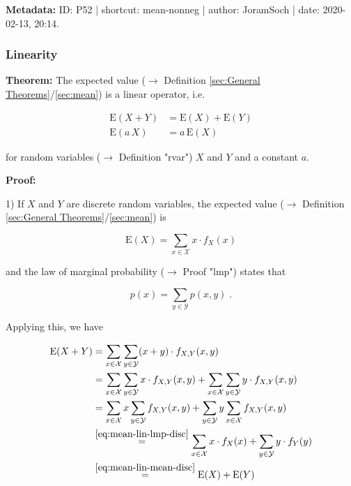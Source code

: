 \documentclass[a4paper,12pt]{book}
\begin{document}
\vspace{1em}
\textbf{Metadata:} ID: P52 | shortcut: mean-nonneg | author: JoramSoch | date: 2020-02-13, 20:14.


\subsubsection[\textbf{Linearity}]{Linearity} \label{sec:mean-lin}

\vspace{1em}
\textbf{Theorem:} The expected value ($\rightarrow$ Definition \ref{sec:General Theorems}/\ref{sec:mean}) is a linear operator, i.e.

\begin{equation} \label{eq:mean-lin-mean-lin}
\begin{split}
\mathrm{E}(X + Y) &= \mathrm{E}(X) + \mathrm{E}(Y) \\
\mathrm{E}(a\,X) &= a\,\mathrm{E}(X)
\end{split}
\end{equation}

for random variables ($\rightarrow$ Definition "rvar") $X$ and $Y$ and a constant $a$.


\vspace{1em}
\textbf{Proof:}

1) If $X$ and $Y$ are discrete random variables, the expected value ($\rightarrow$ Definition \ref{sec:General Theorems}/\ref{sec:mean}) is

\begin{equation} \label{eq:mean-lin-mean-disc}
\mathrm{E}(X) = \sum_{x \in \mathcal{X}} x \cdot f_X(x)
\end{equation}

and the law of marginal probability ($\rightarrow$ Proof "lmp") states that

\begin{equation} \label{eq:mean-lin-lmp-disc}
p(x) = \sum_{y \in \mathcal{Y}} p(x,y) \; .
\end{equation}

Applying this, we have

\begin{equation} \label{eq:mean-lin-mean-lin-s1-disc}
\begin{split}
\mathrm{E}(X + Y) &= \sum_{x \in \mathcal{X}} \sum_{y \in \mathcal{Y}} (x+y) \cdot f_{X,Y}(x,y) \\
&= \sum_{x \in \mathcal{X}} \sum_{y \in \mathcal{Y}} x \cdot f_{X,Y}(x,y) + \sum_{x \in \mathcal{X}} \sum_{y \in \mathcal{Y}} y \cdot f_{X,Y}(x,y) \\
&= \sum_{x \in \mathcal{X}} x \sum_{y \in \mathcal{Y}} f_{X,Y}(x,y) + \sum_{y \in \mathcal{Y}} y \sum_{x \in \mathcal{X}} f_{X,Y}(x,y) \\
&\overset{\eqref{eq:mean-lin-lmp-disc}}{=} \sum_{x \in \mathcal{X}} x \cdot f_X(x) + \sum_{y \in \mathcal{Y}} y \cdot f_{Y}(y) \\
&\overset{\eqref{eq:mean-lin-mean-disc}}{=} \mathrm{E}(X) + \mathrm{E}(Y)
\end{split}
\end{equation}
\end{document}
